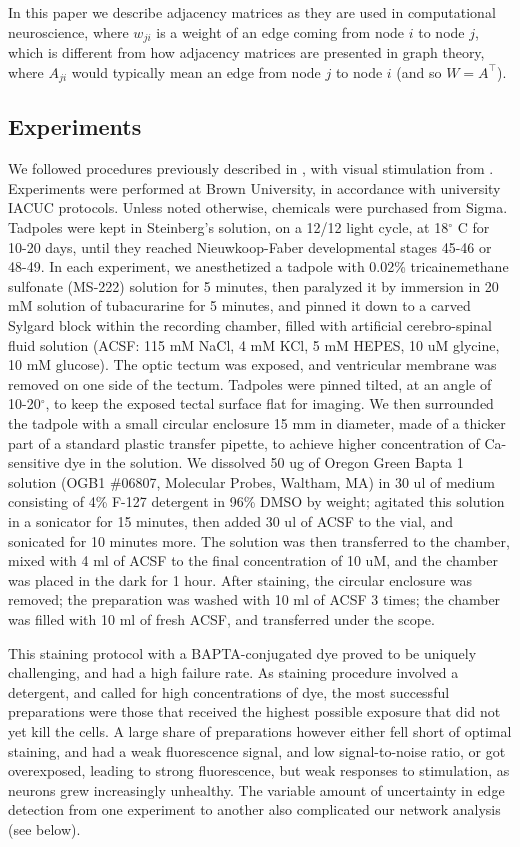 \documentclass{article}
\begin{document}
In this paper we describe adjacency matrices as they are used in computational neuroscience, where $w_{ji}$ is a weight of an edge coming from node $i$ to node $j$, which is different from how adjacency matrices are presented in graph theory, where $A_{ji}$ would typically mean an edge from node $j$ to node $i$ (and so $W = A^\top$).

\subsection*{Experiments}

We followed procedures previously described in \citep{xu2011,truszkowski2017}, with visual stimulation from \citep{khakhalin2014}. Experiments were performed at Brown University, in accordance with university IACUC protocols. Unless noted otherwise, chemicals were purchased from Sigma. Tadpoles were kept in Steinberg’s solution, on a 12/12 light cycle, at 18$^\circ$ C for 10-20 days, until they reached Nieuwkoop-Faber developmental stages 45-46 or 48-49. In each experiment, we anesthetized a tadpole with 0.02\% tricainemethane sulfonate (MS-222) solution for 5 minutes, then paralyzed it by immersion in 20 mM solution of tubacurarine for 5 minutes, and pinned it down to a carved Sylgard block within the recording chamber, filled with artificial cerebro-spinal fluid solution (ACSF: 115 mM NaCl, 4 mM KCl, 5 mM HEPES, 10 uM glycine, 10 mM glucose). The optic tectum was exposed, and ventricular membrane was removed on one side of the tectum. Tadpoles were pinned tilted, at an angle of 10-20$^\circ$, to keep the exposed tectal surface flat for imaging. We then surrounded the tadpole with a small circular enclosure 15 mm in diameter, made of a thicker part of a standard plastic transfer pipette, to achieve higher concentration of Ca-sensitive dye in the solution. We dissolved 50 ug of Oregon Green Bapta 1 solution (OGB1 $\#$06807, Molecular Probes, Waltham, MA) in 30 ul of medium consisting of 4\% F-127 detergent in 96\% DMSO by weight; agitated this solution in a sonicator for 15 minutes, then added 30 ul of ACSF to the vial, and sonicated for 10 minutes more. The solution was then transferred to the chamber, mixed with 4 ml of ACSF to the final concentration of 10 uM, and the chamber was placed in the dark for 1 hour. After staining, the circular enclosure was removed; the preparation was washed with 10 ml of ACSF 3 times; the chamber was filled with 10 ml of fresh ACSF, and transferred under the scope.

This staining protocol with a BAPTA-conjugated dye proved to be uniquely challenging, and had a high failure rate. As staining procedure involved a detergent, and called for high concentrations of dye, the most successful preparations were those that received the highest possible exposure that did not yet kill the cells. A large share of preparations however either fell short of optimal staining, and had a weak fluorescence signal, and low signal-to-noise ratio, or got overexposed, leading to strong fluorescence, but weak responses to stimulation, as neurons grew increasingly unhealthy. The variable amount of uncertainty in edge detection from one experiment to another also complicated our network analysis (see below).
\end{document}
